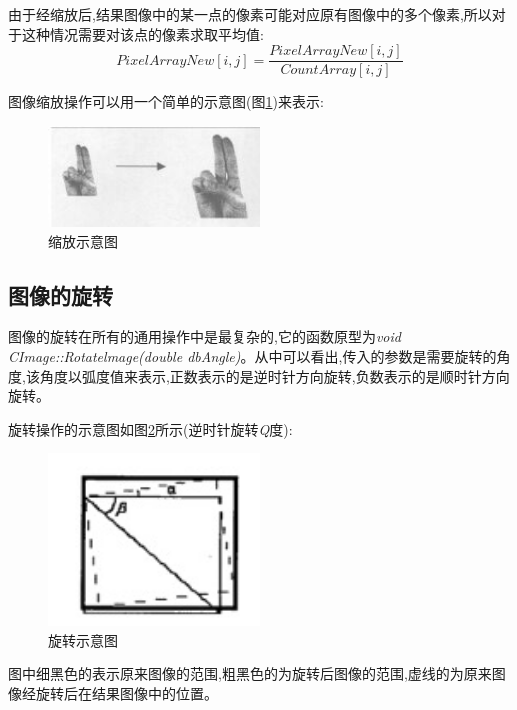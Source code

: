 \documentclass{XDBAthesis}
\begin{document}
由于经缩放后,结果图像中的某一点的像素可能对应原有图像中的多个像素,所以对于这种情况需要对该点的像素求取平均值:
$$
    PixelArrayNew[i,j]=\frac{PixelArrayNew[i,j]}{CountArray[i,j]} %
$$


    图像缩放操作可以用一个简单的示意图(图\ref{fg:ss})来表示:
    
\begin{figure}[htb]
    \centering
    \includegraphics[width=0.5\textwidth]{figure/suofang}
    \caption{缩放示意图}
    \label{fg:ss}
\end{figure}

\subsection{图像的旋转}

    图像的旋转在所有的通用操作中是最复杂的,它的函数原型为\emph{void CImage::Rotatelmage(double dbAngle)}。从中可以看出,传入的参数是需要旋转的角度,该角度以弧度值来表示,正数表示的是逆时针方向旋转,负数表示的是顺时针方向旋转。

旋转操作的示意图如图\ref{fg:roat}所示(逆时针旋转\emph{Q}度):
\begin{figure}[htb]
    \centering
    \includegraphics[width=0.5\textwidth]{figure/roat}
    \caption{旋转示意图}
    \label{fg:roat}
\end{figure}
      

图中细黑色的表示原来图像的范围,粗黑色的为旋转后图像的范围,虚线的为原来图像经旋转后在结果图像中的位置。
\end{document}
